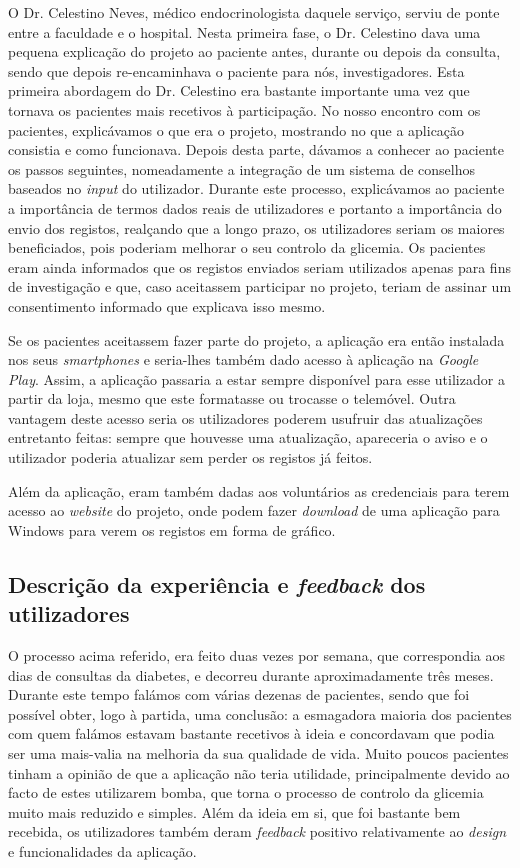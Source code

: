 O Dr. Celestino Neves, médico endocrinologista daquele serviço, serviu de ponte entre a faculdade e o hospital. Nesta primeira fase, o Dr. Celestino dava uma pequena explicação do projeto ao paciente antes, durante ou depois da consulta, sendo que depois re-encaminhava o paciente para nós, investigadores. Esta primeira abordagem do Dr. Celestino era bastante importante uma vez que tornava os pacientes mais recetivos à participação. No nosso encontro com os pacientes, explicávamos o que era o projeto, mostrando no que a aplicação consistia e como funcionava. Depois desta parte, dávamos a conhecer ao paciente os passos seguintes, nomeadamente a integração de um sistema de conselhos baseados no \textit{input} do utilizador. Durante este processo, explicávamos ao paciente a importância de termos dados reais de utilizadores e portanto a importância do envio dos registos, realçando que a longo prazo, os utilizadores seriam os maiores beneficiados, pois poderiam melhorar o seu controlo da glicemia. Os pacientes eram ainda informados que os registos enviados seriam utilizados apenas para fins de investigação e que, caso aceitassem participar no projeto, teriam de assinar um consentimento informado que explicava isso mesmo.

Se os pacientes aceitassem fazer parte do projeto, a aplicação era então instalada nos seus \textit{smartphones} e seria-lhes também dado acesso à aplicação na \textit{Google Play}. Assim, a aplicação passaria a estar sempre disponível para esse utilizador a partir da loja, mesmo que este formatasse ou trocasse o telemóvel. Outra vantagem deste acesso seria os utilizadores poderem usufruir das atualizações entretanto feitas: sempre que houvesse uma atualização, apareceria o aviso e o utilizador poderia atualizar sem perder os registos já feitos.

Além da aplicação, eram também dadas aos voluntários as credenciais para terem acesso ao \textit{website} do projeto, onde podem fazer \textit{download} de uma aplicação para Windows para verem os registos em forma de gráfico.


\subsection{Descrição da experiência e \textit{feedback} dos utilizadores}

O processo acima referido, era feito duas vezes por semana, que correspondia aos dias de consultas da diabetes, e decorreu durante aproximadamente três meses. Durante este tempo falámos com várias dezenas de pacientes, sendo que foi possível obter, logo à partida, uma conclusão: a esmagadora maioria dos pacientes com quem falámos estavam bastante recetivos à ideia e concordavam que podia ser uma mais-valia na melhoria da sua qualidade de vida. Muito poucos pacientes tinham a opinião de que a aplicação não teria utilidade, principalmente devido ao facto de estes utilizarem bomba, que torna o processo de controlo da glicemia muito mais reduzido e simples.
Além da ideia em si, que foi bastante bem recebida, os utilizadores também deram \textit{feedback} positivo relativamente ao \textit{design} e funcionalidades da aplicação. 

